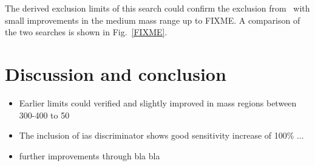 The derived exclusion limits of this search could confirm the exclusion from~\cite{FIXME} with small improvements in the medium mass range up to FIXME\gev.
A comparison of the two searches is shown in Fig.~\ref{FIXME}.
\FloatBarrier
\chapter{Discussion and conclusion}
\label{sec:Discussion}

\begin{itemize}
\item Earlier limits could verified and slightly improved in mass regions between 300-400 to 50\gev
\item The inclusion of ias discriminator shows good sensitivity increase of 100\% ...
\item further improvements through bla bla
\end{itemize}
